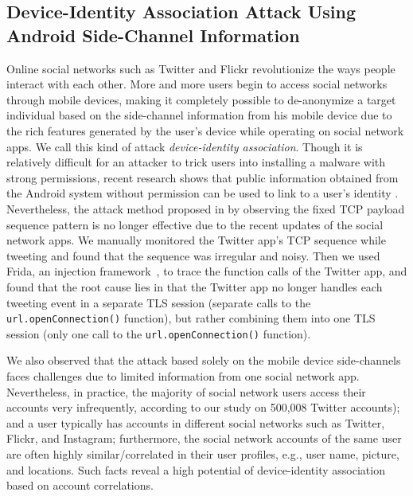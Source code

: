 \documentclass[letterpaper,12pt]{article}
\begin{document}
\subsection{Device-Identity Association Attack Using Android Side-Channel Information}
Online social networks such as Twitter and Flickr revolutionize the ways people interact with each other. More and more users begin to access social networks through mobile devices, making it completely possible to de-anonymize a target individual based on the side-channel information from his mobile device due to the rich features generated by the user's device while operating on social network apps. We call this kind of attack \emph{device-identity association}. Though it is relatively difficult for an attacker to trick users into installing a malware with strong permissions, recent research shows that public information obtained from the Android system without permission can be used to link to a user's identity \cite{zhou2013identity}. Nevertheless, the attack method proposed in \cite{zhou2013identity} by observing the fixed TCP payload sequence pattern is no longer effective due to the recent updates of the social network apps. We manually monitored the Twitter app's TCP sequence while tweeting and found that the sequence was irregular and noisy. Then we used Frida, an injection framework~\cite{frida}, to trace the function calls of the Twitter app, and found that the root cause lies in that the Twitter app no longer handles each tweeting event in a separate TLS session (separate calls to the \texttt{url.openConnection()} function), but rather combining them into one TLS session (only one call to the \texttt{url.openConnection()} function).

We also observed that the attack based solely on the mobile device side-channels faces challenges due to limited information from one social network app. Nevertheless, in practice, the majority of social network users access their accounts very infrequently, according to our study on 500,008 Twitter accounts); and a user typically has accounts in different social networks such as Twitter, Flickr, and Instagram; furthermore, the social network accounts of the same user are often highly similar/correlated in their user profiles, e.g., user name, picture, and locations. Such facts reveal a high potential of device-identity association based on account correlations. 
\end{document}
